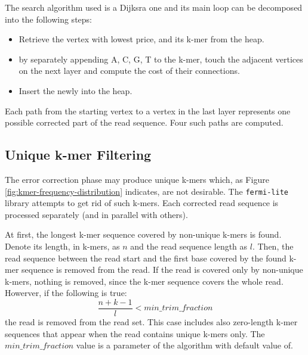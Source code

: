 The search algorithm used is a Dijksra one and its main loop can be decomposed into the following steps:
\begin{itemize}
\item Retrieve the vertex with lowest price, and its k-mer from the heap.
\item by separately appending A, C, G, T to the k-mer, touch the adjacent vertices on the next layer and compute the cost of their connections.
\item Insert the newly into the heap.
\end{itemize}

Each path from the starting vertex to a vertex in the last layer represents one possible corrected part of the read sequence. Four such paths are computed.

\subsection{Unique k-mer Filtering}
\label{subsec:fermi-unique-kmer-filtering}

The error correction phase may produce unique k-mers which, as Figure \ref{fig:kmer-frequency-distribution} indicates, are not desirable. The \texttt{fermi-lite} library attempts to get rid of such k-mers. Each corrected read sequence is processed separately (and in parallel with others). 

At first, the longest k-mer sequence covered by non-unique k-mers is found. Denote its length, in k-mers, as $n$ and the read sequence length as $l$. Then, the read sequence between the read start and the first base covered by the found k-mer sequence is removed from the read. If the read is covered only by non-unique k-mers, nothing is removed, since the k-mer sequence covers the whole read. Howerver, if the following is true:
$$
\frac{n + k - 1}{l} < min\_trim\_fraction
$$
the read is removed from the read set. This case includes also zero-length k-mer sequences that appear when the read contains unique k-mers only. The $min\_trim\_fraction$ value is a parameter of the algorithm with default value of.